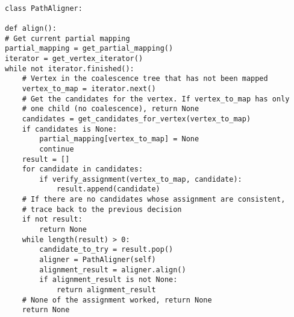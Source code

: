 \documentclass[14pt]{extarticle}
\begin{document}
\begin{lstlisting}

class PathAligner:

def align():
# Get current partial mapping
partial_mapping = get_partial_mapping()
iterator = get_vertex_iterator()
while not iterator.finished():
	# Vertex in the coalescence tree that has not been mapped
	vertex_to_map = iterator.next()
	# Get the candidates for the vertex. If vertex_to_map has only
	# one child (no coalescence), return None
	candidates = get_candidates_for_vertex(vertex_to_map)
	if candidates is None:
		partial_mapping[vertex_to_map] = None
		continue
	result = []
	for candidate in candidates:
		if verify_assignment(vertex_to_map, candidate):
			result.append(candidate)
	# If there are no candidates whose assignment are consistent,
	# trace back to the previous decision
	if not result:
		return None			
	while length(result) > 0:
		candidate_to_try = result.pop()
		aligner = PathAligner(self)
		alignment_result = aligner.align()
		if alignment_result is not None:
			return alignment_result
	# None of the assignment worked, return None
	return None
\end{lstlisting}
\end{document}
